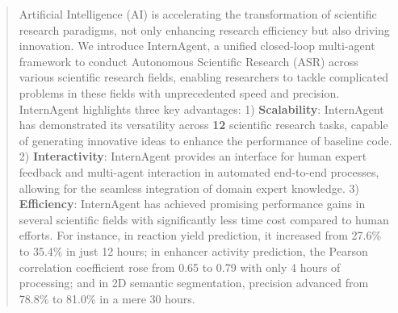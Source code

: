 \begin{abstract}
Artificial Intelligence (AI) is accelerating the transformation of scientific research paradigms, not only enhancing research efficiency but also driving innovation. We introduce InternAgent, a unified closed-loop multi-agent framework to conduct Autonomous Scientific Research (ASR) across various scientific research fields, enabling researchers to tackle complicated problems in these fields with unprecedented speed and precision. InternAgent highlights three key advantages: 1) \textbf{Scalability}: InternAgent has demonstrated its versatility across \textbf{12} scientific research tasks, capable of generating innovative ideas to enhance the performance of baseline code. 2) \textbf{Interactivity}: InternAgent provides an interface for human expert feedback and multi-agent interaction in automated end-to-end processes, allowing for the seamless integration of domain expert knowledge. 3) \textbf{Efficiency}: InternAgent has achieved promising performance gains in several scientific fields with significantly less time cost compared to human efforts. For instance, in reaction yield prediction, it increased from 27.6\% to 35.4\% in just 12 hours; in enhancer activity prediction, the Pearson correlation coefficient rose from 0.65 to 0.79 with only 4 hours of processing; and in 2D semantic segmentation, precision advanced from 78.8\% to 81.0\% in a mere 30 hours.
\end{abstract}
